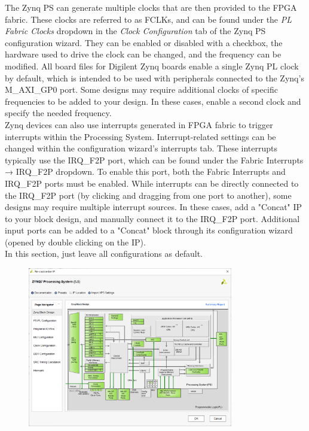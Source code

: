 \documentclass[a4paper,12pt,twoside]{article}
\begin{document}
\begin{itemize}
    The Zynq PS can generate multiple clocks that are then provided to the FPGA fabric. These clocks are referred to as FCLKs, and can be found under the \textit{PL Fabric Clocks} dropdown in the \textit{Clock Configuration} tab of the Zynq PS configuration wizard. They can be enabled or disabled with a checkbox, the hardware used to drive the clock can be changed, and the frequency can be modified. All board files for Digilent Zynq boards enable a single Zynq PL clock by default, which is intended to be used with peripherals connected to the Zynq's M\_AXI\_GP0 port. Some designs may require additional clocks of specific frequencies to be added to your design. In these cases, enable a second clock and specify the needed frequency.\\
    Zynq devices can also use interrupts generated in FPGA fabric to trigger interrupts within the Processing System. Interrupt-related settings can be changed within the configuration wizard's interrupts tab. These interrupts typically use the IRQ\_F2P port, which can be found under the Fabric Interrupts → IRQ\_F2P dropdown. To enable this port, both the Fabric Interrupts and IRQ\_F2P ports must be enabled. While interrupts can be directly connected to the IRQ\_F2P port (by clicking and dragging from one port to another), some designs may require multiple interrupt sources. In these cases, add a "Concat" IP to your block design, and manually connect it to the IRQ\_F2P port. Additional input ports can be added to a "Concat" block through its configuration wizard (opened by double clicking on the IP).\\
    In this section, just leave all configurations as default.
    \begin{figure}[H]
        \centering
        \includegraphics[width=0.8\textwidth]{images/4.png}

\end{figure}
\end{itemize}
\end{document}
